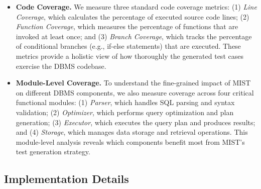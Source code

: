 

\begin{itemize}

    \item \textbf{Code Coverage.} We measure three standard code coverage metrics: (1) \textit{Line Coverage}, which calculates the percentage of executed source code lines; (2) \textit{Function Coverage}, which measures the percentage of functions that are invoked at least once; and (3) \textit{Branch Coverage}, which tracks the percentage of conditional branches (e.g., if-else statements) that are executed. These metrics provide a holistic view of how thoroughly the generated test cases exercise the DBMS codebase.

    \item \textbf{Module-Level Coverage.} To understand the fine-grained impact of MIST on different DBMS components, we also measure coverage across four critical functional modules: (1) \textit{Parser}, which handles SQL parsing and syntax validation; (2) \textit{Optimizer}, which performs query optimization and plan generation; (3) \textit{Executor}, which executes the query plan and produces results; and (4) \textit{Storage}, which manages data storage and retrieval operations. This module-level analysis reveals which components benefit most from MIST's test generation strategy.

\end{itemize}

\subsection{Implementation Details}

